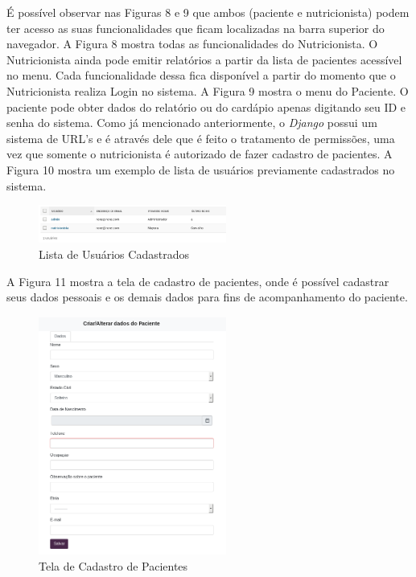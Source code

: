 \documentclass[
	12pt,				%
    oneside,			%
	a4paper,			%
	english,			%
	french,				%
	spanish,			%
	brazil,				%
	]{abntex2}
\begin{document}
É possível observar nas Figuras 8 e 9 que ambos (paciente e nutricionista) podem ter acesso as suas funcionalidades que ficam localizadas na barra superior do navegador.
A Figura 8 mostra todas as funcionalidades do Nutricionista. O Nutricionista
ainda pode emitir relatórios a partir da lista de pacientes acessível no menu. Cada
funcionalidade dessa fica disponível a partir do momento que o Nutricionista realiza 
Login no sistema. A Figura 9 mostra o menu do Paciente. O paciente pode obter dados
do relatório ou do cardápio apenas digitando seu ID e senha do sistema.
Como já mencionado anteriormente, o \textit{Django} possui um sistema de URL's e é através dele que
é feito o tratamento de permissões, uma vez que somente o nutricionista é autorizado de fazer cadastro
de pacientes. A Figura 10 mostra um exemplo de lista de usuários previamente cadastrados no sistema.

\begin{figure} [hbt]
\begin{center}
\includegraphics[width=0.55\textwidth]{listaUsuarios.png}
\end{center}
\label{listUser} 
\caption{Lista de Usuários Cadastrados}
\end{figure}

A Figura 11 mostra a tela de cadastro de pacientes, onde é possível cadastrar
seus dados pessoais e os demais dados para fins de acompanhamento do paciente. 

\begin{figure} [hbt]
\begin{center}
\includegraphics[width=0.55\textwidth]{cadastroPac1.png}
\end{center}
\label{cadastroPac} 
\caption{Tela de Cadastro de Pacientes}
\end{figure}
\end{document}
